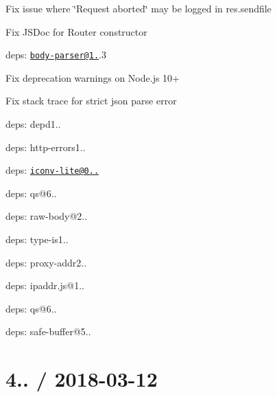 
\begin{DoxyItemize}
\item Fix issue where {\ttfamily \char`\"{}\+Request aborted\char`\"{}} may be logged in {\ttfamily res.\+sendfile}
\item Fix J\+S\+Doc for {\ttfamily Router} constructor
\item deps\+: \href{mailto:body-parser@1.18}{\tt body-\/parser@1.}.3
\begin{DoxyItemize}
\item Fix deprecation warnings on Node.\+js 10+
\item Fix stack trace for strict json parse error
\item deps\+: depd1..
\item deps\+: http-\/errors1..
\item deps\+: \href{mailto:iconv-lite@0.4.23}{\tt iconv-\/lite@0..}
\item deps\+: qs@6..
\item deps\+: raw-\/body@2..
\item deps\+: type-\/is1..
\end{DoxyItemize}
\item deps\+: proxy-\/addr2..
\begin{DoxyItemize}
\item deps\+: ipaddr.\+js@1..
\end{DoxyItemize}
\item deps\+: qs@6..
\item deps\+: safe-\/buffer@5..
\end{DoxyItemize}

\section*{4.. / 2018-\/03-\/12 }


